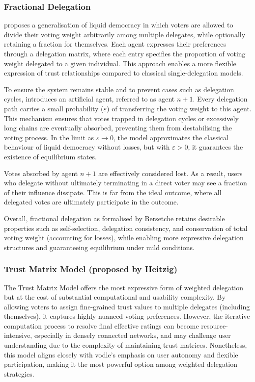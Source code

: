 \subsubsection*{Fractional Delegation~\citep{bersetche2024}}

\citeauthor{bersetche2024} proposes a generalisation of liquid democracy in which voters are allowed to divide their voting weight arbitrarily among multiple delegates, while optionally retaining a fraction for themselves. Each agent expresses their preferences through a delegation matrix, where each entry specifies the proportion of voting weight delegated to a given individual. This approach enables a more flexible expression of trust relationships compared to classical single-delegation models.

To ensure the system remains stable and to prevent cases such as delegation cycles, \citeauthor{bersetche2024} introduces an artificial agent, referred to as agent \(n+1\). Every delegation path carries a small probability (\(\varepsilon\)) of transferring the voting weight to this agent. This mechanism ensures that votes trapped in delegation cycles or excessively long chains are eventually absorbed, preventing them from destabilising the voting process. In the limit as \(\varepsilon \to 0\), the model approximates the classical behaviour of liquid democracy without losses, but with \(\varepsilon > 0\), it guarantees the existence of equilibrium states.

Votes absorbed by agent \(n+1\) are effectively considered lost. As a result, users who delegate without ultimately terminating in a direct voter may see a fraction of their influence dissipate. This is far from the ideal outcome, where all delegated votes are ultimately participate in the outcome.

Overall, fractional delegation as formalised by Bersetche retains desirable properties such as self-selection, delegation consistency, and conservation of total voting weight (accounting for losses), while enabling more expressive delegation structures and guaranteeing equilibrium under mild conditions.


\subsubsection*{Trust Matrix Model (proposed by Heitzig)}

The Trust Matrix Model offers the most expressive form of weighted delegation but at the cost of substantial computational and usability complexity. By allowing voters to assign fine-grained trust values to multiple delegates (including themselves), it captures highly nuanced voting preferences. However, the iterative computation process to resolve final effective ratings can become resource-intensive, especially in densely connected networks, and may challenge user understanding due to the complexity of maintaining trust matrices. Nonetheless, this model aligns closely with vodle's emphasis on user autonomy and flexible participation, making it the most powerful option among weighted delegation strategies.

